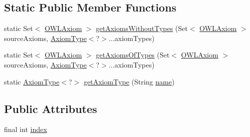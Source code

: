 \subsection*{Static Public Member Functions}
\begin{DoxyCompactItemize}
\item 
static Set$<$ \hyperlink{interfaceorg_1_1semanticweb_1_1owlapi_1_1model_1_1_o_w_l_axiom}{O\-W\-L\-Axiom} $>$ \hyperlink{classorg_1_1semanticweb_1_1owlapi_1_1model_1_1_axiom_type_3_01_c_01extends_01_o_w_l_axiom_01_4_a74194e663793d00973deb8fd11105d87}{get\-Axioms\-Without\-Types} (Set$<$ \hyperlink{interfaceorg_1_1semanticweb_1_1owlapi_1_1model_1_1_o_w_l_axiom}{O\-W\-L\-Axiom} $>$ source\-Axioms, \hyperlink{classorg_1_1semanticweb_1_1owlapi_1_1model_1_1_axiom_type_3_01_c_01extends_01_o_w_l_axiom_01_4_af3ef15094af1800e34dd66f6289c3631}{Axiom\-Type}$<$?$>$...axiom\-Types)
\item 
static Set$<$ \hyperlink{interfaceorg_1_1semanticweb_1_1owlapi_1_1model_1_1_o_w_l_axiom}{O\-W\-L\-Axiom} $>$ \hyperlink{classorg_1_1semanticweb_1_1owlapi_1_1model_1_1_axiom_type_3_01_c_01extends_01_o_w_l_axiom_01_4_ad4355ceffee38cf6ffc2d9caba6acd01}{get\-Axioms\-Of\-Types} (Set$<$ \hyperlink{interfaceorg_1_1semanticweb_1_1owlapi_1_1model_1_1_o_w_l_axiom}{O\-W\-L\-Axiom} $>$ source\-Axioms, \hyperlink{classorg_1_1semanticweb_1_1owlapi_1_1model_1_1_axiom_type_3_01_c_01extends_01_o_w_l_axiom_01_4_af3ef15094af1800e34dd66f6289c3631}{Axiom\-Type}$<$?$>$...axiom\-Types)
\item 
static \hyperlink{classorg_1_1semanticweb_1_1owlapi_1_1model_1_1_axiom_type_3_01_c_01extends_01_o_w_l_axiom_01_4_af3ef15094af1800e34dd66f6289c3631}{Axiom\-Type}$<$?$>$ \hyperlink{classorg_1_1semanticweb_1_1owlapi_1_1model_1_1_axiom_type_3_01_c_01extends_01_o_w_l_axiom_01_4_abc6ad32e9c66c539a055065f2bcc35a7}{get\-Axiom\-Type} (String \hyperlink{classorg_1_1semanticweb_1_1owlapi_1_1model_1_1_axiom_type_3_01_c_01extends_01_o_w_l_axiom_01_4_aafd56e46de36875cc5820c9bf846f0ec}{name})
\end{DoxyCompactItemize}
\subsection*{Public Attributes}
\begin{DoxyCompactItemize}
\item 
final int \hyperlink{classorg_1_1semanticweb_1_1owlapi_1_1model_1_1_axiom_type_3_01_c_01extends_01_o_w_l_axiom_01_4_a809a0987586b5e973db473a8660169f3}{index}
\end{DoxyCompactItemize}

